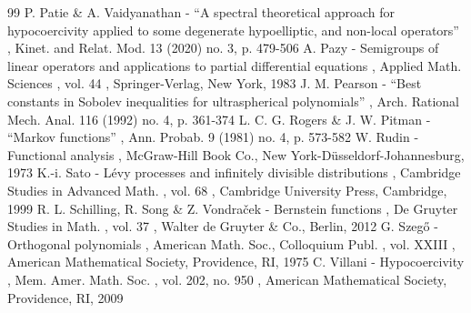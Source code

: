 \documentclass[11pt]{article}
\numberwithin{equation}{section}
\begin{document}
\begin{thebibliography}{99}
 P. Patie \& A. Vaidyanathan - “A spectral theoretical approach for hypocoercivity applied to some degenerate hypoelliptic, and non-local operators” , Kinet. and Relat. Mod. 13 (2020) no. 3, p. 479-506
 A. Pazy - Semigroups of linear operators and applications to partial differential equations , Applied Math. Sciences , vol. 44 , Springer-Verlag, New York, 1983
 J. M. Pearson - “Best constants in Sobolev inequalities for ultraspherical polynomials” , Arch. Rational Mech. Anal. 116 (1992) no. 4, p. 361-374
 L. C. G. Rogers \& J. W. Pitman - “Markov functions” , Ann. Probab. 9 (1981) no. 4, p. 573-582
 W. Rudin - Functional analysis , McGraw-Hill Book Co., New York-Düsseldorf-Johannesburg, 1973
 K.-i. Sato - Lévy processes and infinitely divisible distributions , Cambridge Studies in Advanced Math. , vol. 68 , Cambridge University Press, Cambridge, 1999
 R. L. Schilling, R. Song \& Z. Vondraček - Bernstein functions , De Gruyter Studies in Math. , vol. 37 , Walter de Gruyter \& Co., Berlin, 2012
 G. Szegő - Orthogonal polynomials , American Math. Soc., Colloquium Publ. , vol. XXIII , American Mathematical Society, Providence, RI, 1975
 C. Villani - Hypocoercivity , Mem. Amer. Math. Soc. , vol. 202, no. 950 , American Mathematical Society, Providence, RI, 2009
\end{thebibliography}
\end{document}
